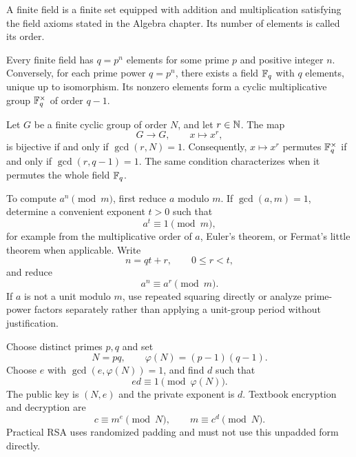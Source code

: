     \begin{definition}
        A finite field is a finite set equipped with addition and multiplication
        satisfying the field axioms stated in the Algebra chapter. Its number of
        elements is called its order.
    \end{definition}

    \begin{theorem}
        Every finite field has $q=p^n$ elements for some prime $p$ and positive
        integer $n$. Conversely, for each prime power $q=p^n$, there exists a
        field $\mathbb{F}_q$ with $q$ elements, unique up to isomorphism. Its
        nonzero elements form a cyclic multiplicative group
        $\mathbb{F}_q^\times$ of order $q-1$.
    \end{theorem}

    \begin{proposition}
        Let $G$ be a finite cyclic group of order $N$, and let $r\in\mathbb{N}$. The map
        \[
            G\to G,
            \qquad
            x\mapsto x^r,
        \]
        is bijective if and only if $\gcd(r,N)=1$. Consequently, $x\mapsto x^r$
        permutes $\mathbb{F}_q^\times$ if and only if $\gcd(r,q-1)=1$. The same
        condition characterizes when it permutes the whole field $\mathbb{F}_q$.
    \end{proposition}

    \begin{algorithm}
        To compute $a^n\pmod m$, first reduce $a$ modulo $m$. If
        $\gcd(a,m)=1$, determine a convenient exponent $t>0$ such that
        \[
            a^t\equiv1\pmod m,
        \]
        for example from the multiplicative order of $a$, Euler's theorem, or
        Fermat's little theorem when applicable. Write
        \[
            n=qt+r,
            \qquad
            0\leq r<t,
        \]
        and reduce
        \[
            a^n\equiv a^r\pmod m.
        \]
        If $a$ is not a unit modulo $m$, use repeated squaring directly or
        analyze prime-power factors separately rather than applying a unit-group
        period without justification.
    \end{algorithm}

    \begin{algorithm}
        Choose distinct primes $p,q$ and set
        \[
            N=pq,
            \qquad
            \varphi(N)=(p-1)(q-1).
        \]
        Choose $e$ with $\gcd(e,\varphi(N))=1$, and find $d$ such that
        \[
            ed\equiv1\pmod{\varphi(N)}.
        \]
        The public key is $(N,e)$ and the private exponent is $d$. Textbook
        encryption and decryption are
        \[
            c\equiv m^e\pmod N,
            \qquad
            m\equiv c^d\pmod N.
        \]
        Practical RSA uses randomized padding and must not use this unpadded
        form directly.
    \end{algorithm}

